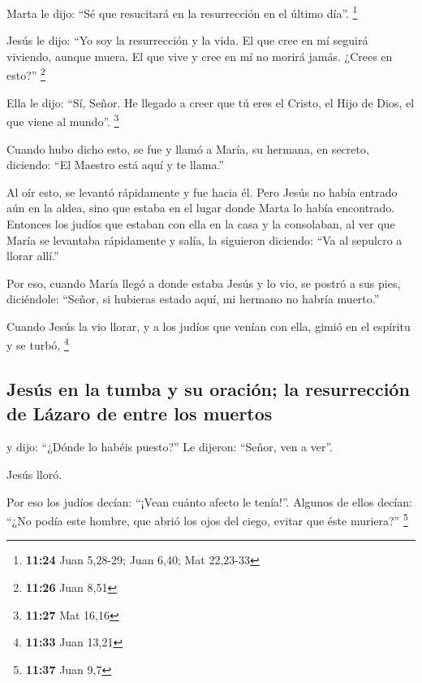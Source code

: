 \begin{paracol}{2}
 Marta le dijo: ``Sé que resucitará en la resurrección en
el último día''. \footnote{\textbf{11:24} Juan 5,28-29; Juan 6,40; Mat
  22,23-33}

 Jesús le dijo: ``Yo soy la resurrección y la vida. El
que cree en mí seguirá viviendo, aunque muera.  El que
vive y cree en mí no morirá jamás. ¿Crees en esto?'' \footnote{\textbf{11:26}
  Juan 8,51}

 Ella le dijo: ``Sí, Señor. He llegado a creer que tú
eres el Cristo, el Hijo de Dios, el que viene al mundo''. \footnote{\textbf{11:27}
  Mat 16,16}

 Cuando hubo dicho esto, se fue y llamó a María, su
hermana, en secreto, diciendo: ``El Maestro está aquí y te llama.''

 Al oír esto, se levantó rápidamente y fue hacia él.
 Pero Jesús no había entrado aún en la aldea, sino que
estaba en el lugar donde Marta lo había encontrado. 
Entonces los judíos que estaban con ella en la casa y la consolaban, al
ver que María se levantaba rápidamente y salía, la siguieron diciendo:
``Va al sepulcro a llorar allí.''

 Por eso, cuando María llegó a donde estaba Jesús y lo
vio, se postró a sus pies, diciéndole: ``Señor, si hubieras estado aquí,
mi hermano no habría muerto.''

 Cuando Jesús la vio llorar, y a los judíos que venían
con ella, gimió en el espíritu y se turbó, \footnote{\textbf{11:33} Juan
  13,21}

\hypertarget{jesuxfas-en-la-tumba-y-su-oraciuxf3n-la-resurrecciuxf3n-de-luxe1zaro-de-entre-los-muertos}{%
\subsection{Jesús en la tumba y su oración; la resurrección de Lázaro de
entre los
muertos}\label{jesuxfas-en-la-tumba-y-su-oraciuxf3n-la-resurrecciuxf3n-de-luxe1zaro-de-entre-los-muertos}}

 y dijo: ``¿Dónde lo habéis puesto?'' Le dijeron:
``Señor, ven a ver''.

 Jesús lloró.

 Por eso los judíos decían: ``¡Vean cuánto afecto le
tenía!''.  Algunos de ellos decían: ``¿No podía este
hombre, que abrió los ojos del ciego, evitar que éste muriera?''
\footnote{\textbf{11:37} Juan 9,7}


\end{paracol}
